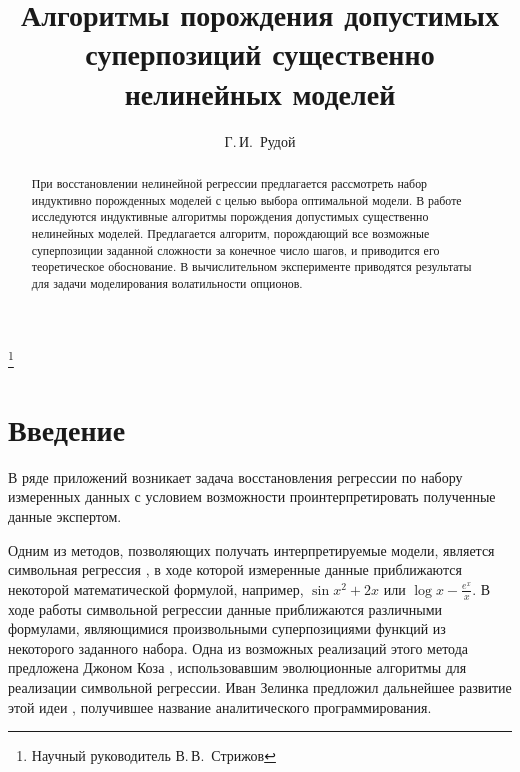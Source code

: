 \documentclass[12pt,a4paper]{amsart}
\begin{document}
\pagestyle{plain}
\lstset{language=C++}

\title{Алгоритмы порождения допустимых суперпозиций существенно нелинейных моделей}
\author{Г.\,И.~Рудой}
\address{Московский физико-технический институт, ФУПМ, каф. <<Интеллектуальные системы>>}
\thanks{Научный руководитель В.\,В.~Стрижов}

\begin{abstract}
  При восстановлении нелинейной регрессии предлагается рассмотреть набор
  индуктивно порожденных моделей с целью выбора оптимальной модели. В работе
  исследуются индуктивные алгоритмы порождения допустимых существенно
  нелинейных моделей. Предлагается алгоритм, порождающий все возможные
  суперпозиции заданной сложности за конечное число шагов, и приводится его
  теоретическое обоснование. В вычислительном эксперименте приводятся
  результаты для задачи моделирования волатильности опционов.
\end{abstract}

\maketitle

\section{Введение}

В ряде приложений \cite{Barmpalexis201175, Shi:2011:CRM, DOI:10.1504/IJCENT.2010.038358}
возникает задача восстановления регрессии по набору измеренных данных с
условием возможности проинтерпретировать полученные данные экспертом.

Одним из методов, позволяющих получать интерпретируемые модели, является
символьная регрессия \cite{davidson:2000:snrea, reference/ml/X10vc},
в ходе которой измеренные данные приближаются некоторой математической
формулой, например, $ \sin x^2 + 2x $ или $\log x - \frac{e^x}{x} $.
В ходе работы символьной регрессии данные приближаются различными формулами,
являющимися произвольными суперпозициями функций из некоторого заданного
набора. Одна из возможных реализаций этого метода
предложена Джоном Коза \cite{Koza1998GP, Koza1998Intro}, использовавшим
эволюционные алгоритмы для реализации символьной регрессии. Иван Зелинка
предложил дальнейшее развитие этой идеи \cite{Zelinka2008}, получившее
название аналитического программирования.
\end{document}

